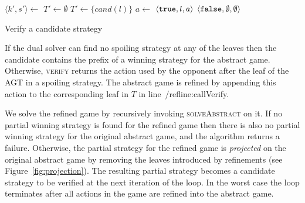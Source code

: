 \begin{algorithm}
    \begin{algorithmic}
            \State $\langle k', s'\rangle \gets $  
             \Continue \EndIIf
                \State $T' \gets \emptyset$
            \Else
                \State $T' \gets \{ cand(l) \}$
            \EndIf
                \State $a \gets $  
                 \Return $\langle \texttt{true}, l, a \rangle$ \EndIIf {}
            \EndFor
            \State \Return $\langle \texttt{false}, \emptyset, \emptyset \rangle$ 
        \EndFunction
    \end{algorithmic}

    \caption{Verify a candidate strategy}
    \label{alg:verify}
\end{algorithm}

If the dual solver can find no spoiling strategy at any of the leaves then the candidate contains the prefix of a winning strategy for the abstract game.  Otherwise, \textsc{verify} returns the action used by the opponent after the leaf of the AGT in a spoiling strategy. The abstract game is refined by appending this action to the corresponding leaf in $T$ in line~/ref{line:callVerify}.

We solve the refined game by recursively invoking \textsc{solveAbstract} on it.  If no partial winning strategy is found for the refined game then there is also no partial winning strategy for the original abstract game, and the algorithm returns a failure.  Otherwise, the partial strategy for the refined game is \emph{projected} on the original abstract game by removing the leaves introduced by refinements (see Figure~\ref{fig:projection}). The resulting partial strategy becomes a candidate strategy to be verified at the next iteration of the loop. In the worst case the loop terminates after all actions in the game are refined into the abstract game.  

